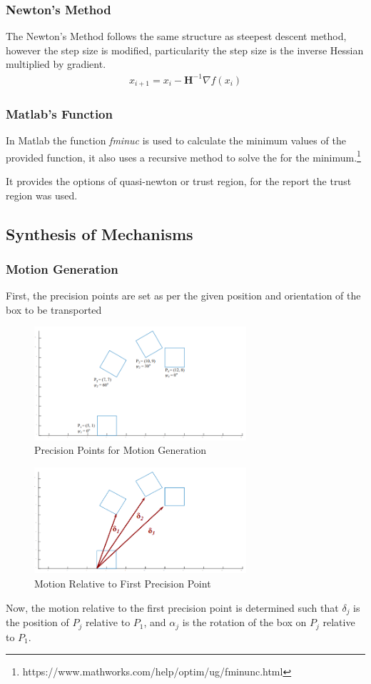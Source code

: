 \documentclass[12pt]{article}
\begin{document}
\subsubsection{Newton's Method}
The Newton’s Method follows the same structure as steepest descent method, however the step size is modified, particularity  the step size is the inverse Hessian multiplied by gradient.
\begin{align}
    x_{i+1}=x_i-\textbf{H}^{-1}\nabla f(x_i)
\end{align}

\subsubsection{Matlab's Function}
In Matlab the function \textit{fminuc} is used to calculate the minimum values of the provided function, it also uses a recursive method to solve the for the minimum.\footnote{https://www.mathworks.com/help/optim/ug/fminunc.html}

It provides the options of quasi-newton or trust region, for the report the trust region was used. 
\pagebreak
\subsection{Synthesis of Mechanisms}
\subsubsection{Motion Generation}
First, the precision points are set as per the given position and orientation of the box to be transported
\begin{figure}[h!]
    \centering
    \includegraphics[width=0.7\textwidth]{MG_1.png}
    \caption{Precision Points for Motion Generation}
\end{figure}
\begin{figure}[h!]
    \centering
    \includegraphics[width=0.7\textwidth]{MG_2.png}
    \caption{Motion Relative to First Precision Point}
\end{figure}
Now, the motion relative to the first precision point is determined such that $\delta_j$ is the position of $P_j$ relative to $P_1$, and $\alpha_j$ is the rotation of the box on $P_j$ relative to $P_1$. 
\end{document}
